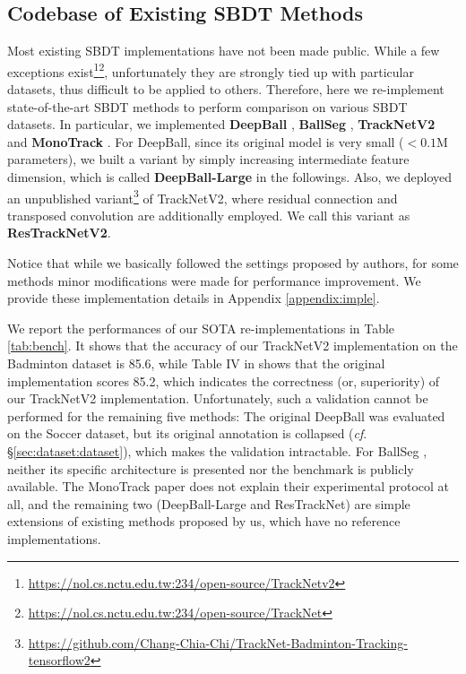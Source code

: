 \documentclass{bmvc2k}
\begin{document}
\subsection{Codebase of Existing SBDT Methods}
\label{sec:eval:baseline}
Most existing SBDT implementations have not been made public.
While a few exceptions exist\footnote{\url{https://nol.cs.nctu.edu.tw:234/open-source/TrackNetv2}}\footnote{\url{https://nol.cs.nctu.edu.tw:234/open-source/TrackNet}}, unfortunately they are strongly tied up with particular datasets, thus difficult to be applied to others.
Therefore, here we re-implement state-of-the-art SBDT methods to perform comparison on various SBDT datasets.
In particular, we implemented \textbf{DeepBall} \cite{komorowski+2019mva,komorowski+2020visapp}, \textbf{BallSeg} \cite{zandycke+2019mmsports}, \textbf{TrackNetV2} \cite{sun+2020icpai} and \textbf{MonoTrack} \cite{liu+2022cvprw}.
For DeepBall, since its original model is very small ($< 0.1$M parameters), we built a variant by simply increasing intermediate feature dimension, which is called \textbf{DeepBall-Large} in the followings.
Also, we deployed an unpublished variant\footnote{\url{https://github.com/Chang-Chia-Chi/TrackNet-Badminton-Tracking-tensorflow2}} of TrackNetV2, where residual connection and transposed convolution are additionally employed.
We call this variant as \textbf{ResTrackNetV2}.
\par
Notice that while we basically followed the settings proposed by authors, for some methods minor modifications were made for performance improvement.
We provide these implementation details in Appendix \ref{appendix:imple}.
\par
We report the performances of our SOTA re-implementations in Table \ref{tab:bench}.
It shows that the accuracy of our TrackNetV2 \cite{sun+2020icpai} implementation on the Badminton dataset is 85.6, while Table IV in \cite{sun+2020icpai} shows that the original implementation scores 85.2, which indicates the correctness (or, superiority) of our TrackNetV2 implementation.
Unfortunately, such a validation cannot be performed for the remaining five methods:
The original DeepBall \cite{komorowski+2019visapp} was evaluated on the Soccer dataset, but its original annotation is collapsed ({\it cf}. \S \ref{sec:dataset:dataset}), which makes the validation intractable.
For BallSeg \cite{zandycke+2019mmsports}, neither its specific architecture is presented nor the benchmark is publicly available.
The MonoTrack paper \cite{liu+2022cvprw} does not explain their experimental protocol at all, and the remaining two (DeepBall-Large and ResTrackNet) are simple extensions of existing methods proposed by us, which have no reference implementations.
\end{document}
